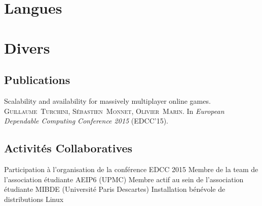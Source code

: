 \documentclass[11pt,a4paper,sans]{moderncv}
\begin{document}

\section{Langues}
\vspace{1em}


\vspace{0.5em}


\section{Divers}
\vspace{0.3em}

\subsection{Publications}
\vspace{1em}

       {
            Scalability and availability for massively multiplayer online games.\endgraf
            \textsc{Guillaume~Turchini, Sébastien~Monnet, Olivier~Marin}.\endgraf
            In \textit{European Dependable Computing Conference 2015} (EDCC'15).
       }
       
\vspace{0.5em}

\subsection{Activités Collaboratives}
\vspace{1em}

       {Participation à l'organisation de la conférence EDCC 2015}
       {Membre de la team de l'association étudiante AEIP6 (UPMC)}
       {Membre actif au sein de l'association étudiante MIBDE (Université Paris Descartes)}
       {Installation bénévole de distributions Linux}
\end{document}
